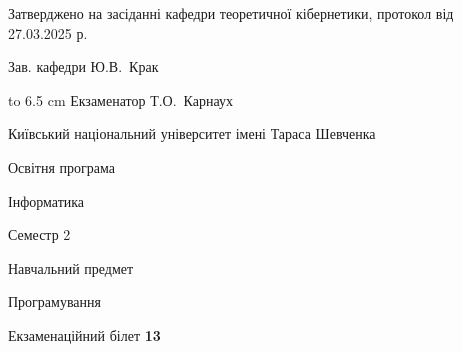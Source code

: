 \documentclass[12pt, ukrainian]{article}
\begin{document}
{\smallskip\smallskip \begin {scriptsize} Затверджено на засіданні кафедри теоретичної кібернетики, протокол   від   27.03.2025 р.\par\smallskip\smallskip\smallskip\smallskip
{\parbox {6.5 cm} {Зав. кафедри \dotfill Ю.В.~Крак}}\hspace {0.7cm} {\hbox to 6.5 cm { Екзаменатор \dotfill Т.О.~Карнаух}} \end{scriptsize}}
\newpage
{{\begin {scriptsize}\par
{ \center  Київський національний університет імені Тараса Шевченка \par}
{\parbox {5 cm}{Освітня програма \hfill}{\parbox {7 cm}{Інформатика\hfill}}\parbox {6 cm}{\hfill Семестр 2}}\par
{\parbox {5 cm} {Навчальний предмет \hfill}\parbox {7 cm}{Програмування \hfill}\parbox {6cm}{\hfill}\par}\vspace{-15pt} \end{scriptsize}}{\center Екзаменаційний білет \No \textbf { 13 }\par}}
\end{document}

